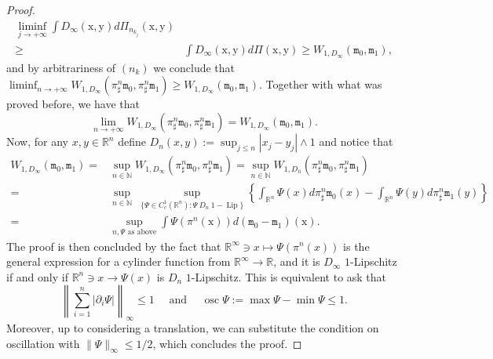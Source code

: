 \documentclass[10pt,a4paper]{amsart}
\newcommand{\N}{\mathbb{N}}
\newcommand{\R}{\mathbb{R}}
\begin{document}
\begin{proof}
\begin{align*}
        \liminf_{j\to+\infty} \int D_\infty(\mathrm{x},\mathrm{y}) d\Pi_{n_{k_j}}(\mathrm{x},\mathrm{y}) 
        \\
        \geq & 
        \int D_\infty(\mathrm{x},\mathrm{y}) d\Pi(\mathrm{x},\mathrm{y}) \geq W_{1,D_\infty}(\mathtt{m}_0,\mathtt{m}_1),
    \end{align*}
    and by arbitrariness of $(n_k)$ we conclude that $\liminf_{n\to+\infty} W_{1,D_\infty}(\pi^{n}_\sharp \mathtt{m}_0,\pi^{n}_\sharp \mathtt{m}_1) 
        \geq W_{1,D_\infty}(\mathtt{m}_0,\mathtt{m}_1) 
        $. Together with what was proved before, we have that 
        \begin{equation}
            \lim_{n\to+\infty} W_{1,D_\infty}(\pi^{n}_\sharp \mathtt{m}_0,\pi^{n}_\sharp \mathtt{m}_1) 
        = W_{1,D_\infty}(\mathtt{m}_0,\mathtt{m}_1) .
        \end{equation}
        Now, for any $x,y\in \R^n$ define $D_n(x,y) := \sup_{j\leq n} |x_j-y_j|\wedge 1$ and notice that 
        \begin{align*}
            W_{1,D_\infty}(\mathtt{m}_0,\mathtt{m}_1) 
            = & 
            \sup_{n\in \N} W_{1,D_\infty}(\pi^n_\sharp \mathtt{m}_0,\pi^n_\sharp \mathtt{m}_1)
            = 
            \sup_{n\in \N} W_{1,D_n}(\pi^n_\sharp \mathtt{m}_0,\pi^n_\sharp \mathtt{m}_1)
            \\
            = &
            \sup_{n\in \N} \ \sup_{\{\Psi\in C_c^1(\R^n): \Psi\  D_n \ 1-\operatorname{Lip}\}} \left\{ \int_{\R^n} \Psi(x) d\pi^n_\sharp \mathtt{m}_0(x) - \int_{\R^n} \Psi(y) d\pi^n_\sharp \mathtt{m}_1(y) \right\}
            \\
            = & \sup_{n, \Psi \text{ as above}} \int \Psi(\pi^n(\mathrm{x})) d(\mathtt{m}_0 - \mathtt{m}_1)(\mathrm{x}).
        \end{align*}
        The proof is then concluded by the fact that $\R^\infty \ni x \mapsto \Psi(\pi^n(x))$ is the general expression for a cylinder function from $\R^\infty\to\R$, and it is $D_\infty$ $1$-Lipschitz if and only if $\R^n \ni x \to \Psi(x)$ is $D_n$ $1$-Lipschitz. This is equivalent to ask that 
        \[\left\|\sum_{i=1}^n |\partial_i\Psi|\right\|_\infty  \leq 1 \quad \text{ and }\quad \operatorname{osc}\Psi:= \max \Psi - \min \Psi \leq 1.\]
        Moreover, up to considering a translation, we can substitute the condition on oscillation with $\|\Psi\|_\infty\leq 1/2$, which concludes the proof.
\end{proof}
\end{document}
